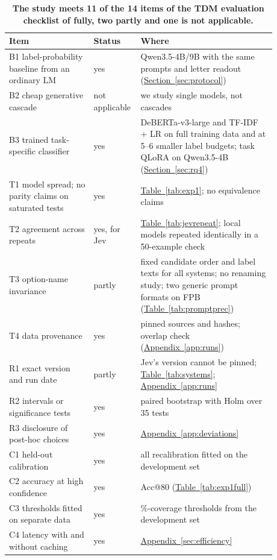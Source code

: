 \begin{table}[htbp]
  \centering
  \caption{\textbf{The study meets 11 of the 14 items of the TDM evaluation checklist of \citet{tang2026audit} fully,
  two partly and one is not applicable.}}
  \label{tab:checklist}
  \scriptsize
  \setlength{\tabcolsep}{4pt}
  \begin{tabular}{>{\raggedright\arraybackslash}p{0.30\linewidth}>{\raggedright\arraybackslash}p{0.10\linewidth}>{\raggedright\arraybackslash}p{0.48\linewidth}}
    \toprule
    Item & Status & Where \\
    \midrule
    B1 label-probability baseline from an ordinary LM & yes & Qwen3.5-4B/9B with the same prompts and letter readout (\hyperref[sec:protocol]{Section~\ref*{sec:protocol}}) \\
    B2 cheap generative cascade & not applicable & we study single models, not cascades \\
    B3 trained task-specific classifier & yes & DeBERTa-v3-large and TF-IDF + LR on full training data and at 5--6 smaller label budgets; task QLoRA on Qwen3.5-4B (\hyperref[sec:rq4]{Section~\ref*{sec:rq4}}) \\
    T1 model spread; no parity claims on saturated tests & yes & \hyperref[tab:exp1]{Table~\ref*{tab:exp1}}; no equivalence claims \\
    T2 agreement across repeats & yes, for Jev & \hyperref[tab:jevrepeat]{Table~\ref*{tab:jevrepeat}}; local models repeated identically in a 50-example check \\
    T3 option-name invariance & partly & fixed candidate order and label texts for all systems; no renaming study;
    two generic prompt formats on FPB (\hyperref[tab:promptprec]{Table~\ref*{tab:promptprec}}) \\
    T4 data provenance & yes & pinned sources and hashes; overlap check (\hyperref[app:runs]{Appendix~\ref*{app:runs}}) \\
    R1 exact version and run date & partly & Jev's version cannot be pinned; \hyperref[tab:systems]{Table~\ref*{tab:systems}}; \hyperref[app:runs]{Appendix~\ref*{app:runs}} \\
    R2 intervals or significance tests & yes & paired bootstrap with Holm over 35 tests \\
    R3 disclosure of post-hoc choices & yes & \hyperref[app:deviations]{Appendix~\ref*{app:deviations}} \\
    C1 held-out calibration & yes & all recalibration fitted on the development set \\
    C2 accuracy at high confidence & yes & Acc@80 (\hyperref[tab:exp1full]{Table~\ref*{tab:exp1full}}) \\
    C3 thresholds fitted on separate data & yes & 80\%-coverage thresholds from the development set \\
    C4 latency with and without caching & yes & \hyperref[sec:efficiency]{Appendix~\ref*{sec:efficiency}} \\
    \bottomrule
  \end{tabular}
\end{table}

